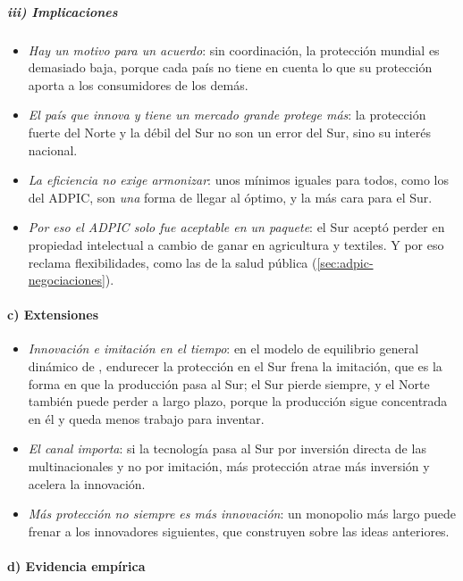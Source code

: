 \documentclass[11pt]{article}
\begin{document}
\subparagraph{iii) Implicaciones}

\begin{itemize}
\item \emph{Hay un motivo para un acuerdo}: sin coordinación, la protección mundial es demasiado baja, porque cada país no tiene en cuenta lo que su protección aporta a los consumidores de los demás.
\item \emph{El país que innova y tiene un mercado grande protege más}: la protección fuerte del Norte y la débil del Sur no son un error del Sur, sino su interés nacional.
\item \emph{La eficiencia no exige armonizar}: unos mínimos iguales para todos, como los del ADPIC, son \emph{una} forma de llegar al óptimo, y la más cara para el Sur.
\item \emph{Por eso el ADPIC solo fue aceptable en un paquete}: el Sur aceptó perder en propiedad intelectual a cambio de ganar en agricultura y textiles. Y por eso reclama flexibilidades, como las de la salud pública (\ref{sec:adpic-negociaciones}).
\end{itemize}

\paragraph{c) Extensiones}

\begin{itemize}
\item \emph{Innovación e imitación en el tiempo}: en el modelo de equilibrio general dinámico de \textcite{Helpman1993Innovation}, endurecer la protección en el Sur frena la imitación, que es la forma en que la producción pasa al Sur; el Sur pierde siempre, y el Norte también puede perder a largo plazo, porque la producción sigue concentrada en él y queda menos trabajo para inventar.
\item \emph{El canal importa}: si la tecnología pasa al Sur por inversión directa de las multinacionales y no por imitación, más protección atrae más inversión y acelera la innovación\nocite{Lai1998International}.
\item \emph{Más protección no siempre es más innovación}: un monopolio más largo puede frenar a los innovadores siguientes, que construyen sobre las ideas anteriores\nocite{Scotchmer1991Standing}.
\end{itemize}

\paragraph{d) Evidencia empírica}
\end{document}

